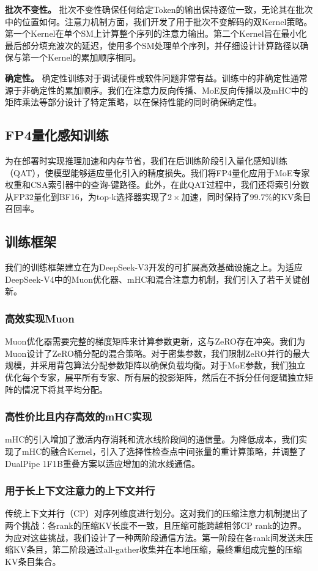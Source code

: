 \documentclass[11pt,a4paper]{article}
\newcommand{\dsvfour}{DeepSeek-V4}
\newcommand{\dsvthree}{DeepSeek-V3}
\newcommand{\moe}{MoE}
\begin{document}
\textbf{批次不变性。} 批次不变性确保任何给定Token的输出保持逐位一致，无论其在批次中的位置如何。注意力机制方面，我们开发了用于批次不变解码的双Kernel策略。第一个Kernel在单个SM上计算整个序列的注意力输出。第二个Kernel旨在最小化最后部分填充波次的延迟，使用多个SM处理单个序列，并仔细设计计算路径以确保与第一个Kernel的累加顺序相同。

\textbf{确定性。} 确定性训练对于调试硬件或软件问题非常有益。训练中的非确定性通常源于非确定性的累加顺序。我们在注意力反向传播、\moe{}反向传播以及mHC中的矩阵乘法等部分设计了特定策略，以在保持性能的同时确保确定性。

\subsection{FP4量化感知训练}
为在部署时实现推理加速和内存节省，我们在后训练阶段引入量化感知训练（QAT），使模型能够适应量化引入的精度损失。我们将FP4量化应用于\moe{}专家权重和CSA索引器中的查询-键路径。此外，在此QAT过程中，我们还将索引分数从FP32量化到BF16，为top-k选择器实现了\(2\times\)加速，同时保持了\(99.7\%\)的KV条目召回率。

\subsection{训练框架}
我们的训练框架建立在为\dsvthree 开发的可扩展高效基础设施之上。为适应\dsvfour 中的Muon优化器、mHC和混合注意力机制，我们引入了若干关键创新。

\subsubsection{高效实现Muon}
Muon优化器需要完整的梯度矩阵来计算参数更新，这与ZeRO存在冲突。我们为Muon设计了ZeRO桶分配的混合策略。对于密集参数，我们限制ZeRO并行的最大规模，并采用背包算法分配参数矩阵以确保负载均衡。对于\moe{}参数，我们独立优化每个专家，展平所有专家、所有层的投影矩阵，然后在不拆分任何逻辑独立矩阵的情况下将其平均分配。

\subsubsection{高性价比且内存高效的mHC实现}
mHC的引入增加了激活内存消耗和流水线阶段间的通信量。为降低成本，我们实现了mHC的融合Kernel，引入了选择性检查点中间张量的重计算策略，并调整了DualPipe 1F1B重叠方案以适应增加的流水线通信。

\subsubsection{用于长上下文注意力的上下文并行}
传统上下文并行（CP）对序列维度进行划分。这对我们的压缩注意力机制提出了两个挑战：各rank的压缩KV长度不一致，且压缩可能跨越相邻CP rank的边界。为应对这些挑战，我们设计了一种两阶段通信方法。第一阶段在各rank间发送未压缩KV条目，第二阶段通过all-gather收集并在本地压缩，最终重组成完整的压缩KV条目集合。
\end{document}
